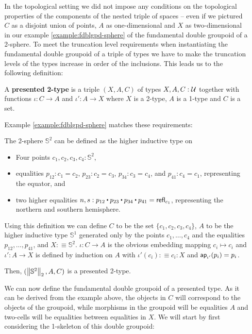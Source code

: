 In the topological setting we did not impose any conditions on the topological
properties of the components of the nested triple of spaces -- even if we pictured
$C$ as a disjoint union of points, $A$ as one-dimensional and $X$ as two-dimensional
in our example \ref{example:fdblgpd-sphere} of the fundamental double groupoid
of a 2-sphere.
To meet the truncation level requirements when instantiating the fundamental
double groupoid of a triple of types we have to make the truncation levels of the
types increase in order of the inclusions.
This leads us to the following definition:

\begin{defn}
A \textbf{presented 2-type} is a triple $(X,A,C)$ of types $X, A, C : \UU$ together
with functions $\iota : C \to A$ and $\iota' : A \to X$ where $X$ is a 2-type,
$A$ is a 1-type and $C$ is a set.
\end{defn}

Example \ref{example:fdblgpd-sphere} matches these requirements:

\begin{example}
The 2-sphere $\mathbb{S}^2$ can be defined as the higher inductive type on
\begin{itemize}
\item Four points $c_1, c_2, c_3, c_4 : \mathbb{S}^2$,
\item equalities $p_{12} : c_1 = c_2$, $p_{23} : c_2 = c_3$, $p_{34} : c_3 = c_4$,
	and $p_{41} : c_4 = c_1$, representing the equator, and
\item two higher equalities $n,s:p_{12} \ct p_{23} \ct p_{34} \ct p_{41} = \refl_{c_1}$,
representing the northern and southern hemisphere.
\end{itemize}
Using this definition we can define $C$ to be the set $\{c_1,c_2,c_3,c_4\}$,
$A$ to be the higher inductive type $\mathbb{S}^1$ generated only by the points $c_1, \ldots,
c_4$ and the equalities $p_{12}, \ldots, p_{41}$, and $X :\equiv \mathbb{S}^2$.
$\iota : C \to A$ is the obvious embedding mapping $c_i \mapsto c_i$ and
$\iota' : A \to X$ is defined by induction on $A$ with $\iota'(c_i) :\equiv c_i : X$
and $\ap_{\iota'}(p_i) = p_i$.

Then, $(\trunc{2}{\mathbb{S}^2}, A, C)$ is a presented 2-type.
\end{example}

We can now define the fundamental double groupoid of a presented type.
As it can be derived from the example above, the objects in $C$ will correspond
to the objects of the groupoid, while morphisms in the groupoid will be
equalities $A$ and two-cells will be equalities between equalities in $X$.
We will start by first considering the 1-skeleton of this double groupoid:

